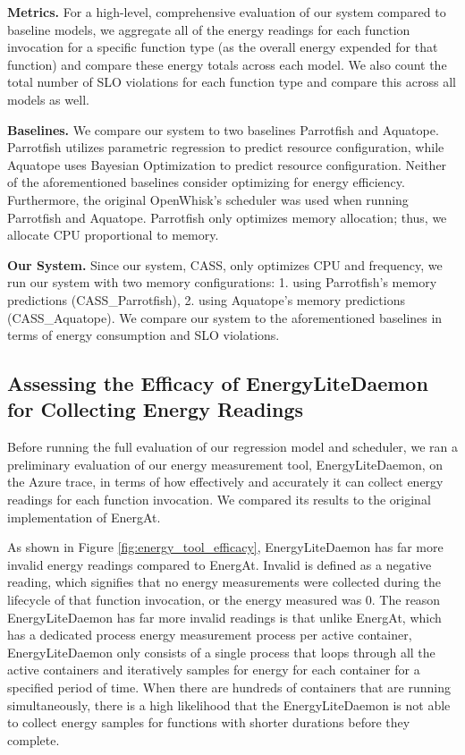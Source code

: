 \documentclass[times, 10pt,twocolumn]{article}
\begin{document}
\textbf{Metrics.} For a high-level, comprehensive evaluation of our system compared to baseline models, we aggregate all of the energy readings for each function invocation for a specific function type (as the overall energy expended for that function) and compare these energy totals across each model. We also count the total number of SLO violations for each function type and compare this across all models as well.

\textbf{Baselines.} We compare our system to two baselines Parrotfish and Aquatope. Parrotfish \cite{parrotfish} utilizes parametric regression to predict resource configuration, while Aquatope \cite{aquatope} uses Bayesian Optimization to predict resource configuration. Neither of the aforementioned baselines consider optimizing for energy efficiency. Furthermore, the original OpenWhisk's scheduler was used when running Parrotfish and Aquatope. Parrotfish only optimizes memory allocation; thus, we allocate CPU proportional to memory. 

\textbf{Our System.} Since our system, CASS, only optimizes CPU and frequency, we run our system with two memory configurations: 1. using Parrotfish's memory predictions (CASS\_Parrotfish), 2. using Aquatope's memory predictions (CASS\_Aquatope). We compare our system to the aforementioned baselines in terms of energy consumption and SLO violations.

\subsection{Assessing the Efficacy of EnergyLiteDaemon for Collecting Energy Readings}

Before running the full evaluation of our regression model and scheduler, we ran a preliminary evaluation of our energy measurement tool, EnergyLiteDaemon, on the Azure trace, in terms of how effectively and accurately it can collect energy readings for each function invocation. We compared its results to the original implementation of EnergAt.  

As shown in Figure \ref{fig:energy_tool_efficacy}, EnergyLiteDaemon has far more invalid energy readings compared to EnergAt. Invalid is defined as a negative reading, which signifies that no energy measurements were collected during the lifecycle of that function invocation, or the energy measured was 0. The reason EnergyLiteDaemon has far more invalid readings is that unlike EnergAt, which has a dedicated process energy measurement process per active container, EnergyLiteDaemon only consists of a single process that loops through all the active containers and iteratively samples for energy for each container for a specified period of time. When there are hundreds of containers that are running simultaneously, there is a high likelihood that the EnergyLiteDaemon is not able to collect energy samples for functions with shorter durations before they complete. 
\end{document}
